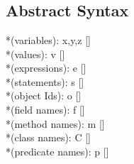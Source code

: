 \documentclass {llncs}
\begin{document}
%
%
%

\section{\svlrp}
\subsection{Abstract Syntax} \label{svlrp-syntax}
%        
%

\begin{plstx}
*(variables): x,y,z [\in]  \\
*(values): v [\in]  \\
*(expressions): e [\in]  \\
*(statements): s [\in]  \\
*(object Ids): o [\in]  \\
*(field names): f [\in]  \\
*(method names): m [\in]  \\
*(class names): C [\in]  \\
*(predicate names): p [\in]  \\
\end{plstx}
\end{document}
